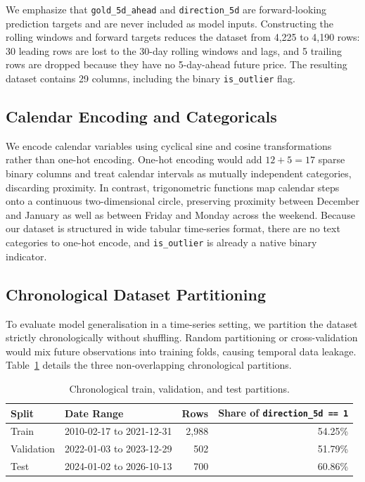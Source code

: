We emphasize that \texttt{gold\_5d\_ahead} and \texttt{direction\_5d} are forward-looking prediction targets and are never included as model inputs. Constructing the rolling windows and forward targets reduces the dataset from 4,225 to 4,190 rows: 30 leading rows are lost to the 30-day rolling windows and lags, and 5 trailing rows are dropped because they have no 5-day-ahead future price. The resulting dataset contains 29 columns, including the binary \texttt{is\_outlier} flag.

\subsection{Calendar Encoding and Categoricals}

We encode calendar variables using cyclical sine and cosine transformations rather than one-hot encoding. One-hot encoding would add $12 + 5 = 17$ sparse binary columns and treat calendar intervals as mutually independent categories, discarding proximity. In contrast, trigonometric functions map calendar steps onto a continuous two-dimensional circle, preserving proximity between December and January as well as between Friday and Monday across the weekend. Because our dataset is structured in wide tabular time-series format, there are no text categories to one-hot encode, and \texttt{is\_outlier} is already a native binary indicator.

\subsection{Chronological Dataset Partitioning}

To evaluate model generalisation in a time-series setting, we partition the dataset strictly chronologically without shuffling. Random partitioning or cross-validation would mix future observations into training folds, causing temporal data leakage. Table~\ref{tab:splits} details the three non-overlapping chronological partitions.

\begin{table}[H]
  \centering
  \small
  \begin{tabular}{llrr}
    \toprule
    Split & Date Range & Rows & Share of \texttt{direction\_5d == 1} \\
    \midrule
    Train & 2010-02-17 to 2021-12-31 & 2,988 & 54.25\% \\
    Validation & 2022-01-03 to 2023-12-29 & 502 & 51.79\% \\
    Test & 2024-01-02 to 2026-10-13 & 700 & 60.86\% \\
    \bottomrule
  \end{tabular}
  \caption{Chronological train, validation, and test partitions.}
  \label{tab:splits}
\end{table}

